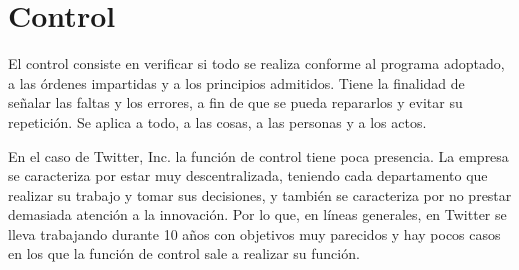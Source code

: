 \section{Control}

El control consiste en verificar si todo se realiza conforme al programa adoptado, a las órdenes impartidas y a los principios admitidos. Tiene la finalidad de señalar las faltas y los errores, a fin de que se pueda repararlos y evitar su repetición. Se aplica a todo, a las cosas, a las personas y a los actos. 

En el caso de Twitter, Inc. la función de control tiene poca presencia. La empresa se caracteriza por estar muy descentralizada, teniendo cada departamento que realizar su trabajo y tomar sus decisiones, y también se caracteriza por no prestar demasiada atención a la innovación. Por lo que, en líneas generales, en Twitter se lleva trabajando durante 10 años con objetivos muy parecidos y hay pocos casos en los que la función de control sale a realizar su función.
